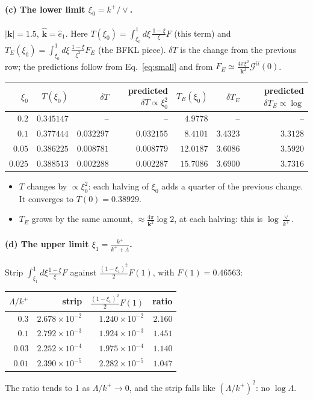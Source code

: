 \documentclass[10pt]{article}
\numberwithin{equation}{section}
\newcommand{\GG}{\mathcal G}
\begin{document}
\paragraph{(c) The lower limit $\xi_0=k^+/\vee$.} $|\mathbf k|=1.5$, $\hat{\mathbf k}=\hat e_1$. Here $T(\xi_0)=\int_{\xi_0}^1d\xi\,\frac{1-\xi}{\xi}F$ (this term) and $T_E(\xi_0)=\int_{\xi_0}^1d\xi\,\frac{1-\xi}{\xi^3}F_E$ (the BFKL piece). $\delta T$ is the change from the previous row; the predictions follow from Eq.~\eqref{eq:small} and from $F_E\simeq\frac{4\pi\xi^2}{\mathbf k^2}\GG^{ii}(0)$.
\begin{center}\small
\begin{tabular}{@{}rrrr|rrr@{}}\toprule
$\xi_0$ & $T(\xi_0)$ & $\delta T$ & predicted $\delta T\propto\xi_0^2$ & $T_E(\xi_0)$ & $\delta T_E$ & predicted $\delta T_E\propto\log$\\\midrule
$0.2$ & $0.345147$ & -- & -- & $4.9778$ & -- & --\\
$0.1$ & $0.377444$ & $0.032297$ & $0.032155$ & $8.4101$ & $3.4323$ & $3.3128$\\
$0.05$ & $0.386225$ & $0.008781$ & $0.008779$ & $12.0187$ & $3.6086$ & $3.5920$\\
$0.025$ & $0.388513$ & $0.002288$ & $0.002287$ & $15.7086$ & $3.6900$ & $3.7316$\\
\bottomrule
\end{tabular}
\end{center}
\begin{itemize}
\item $T$ changes by $\propto\xi_0^2$: each halving of $\xi_0$ adds a quarter of the previous change. It converges to $T(0)=0.38929$.
\item $T_E$ grows by the same amount, $\approx\frac{4\pi}{\mathbf k^2}\log2$, at each halving: this is $\log\frac{\vee}{k^+}$.
\end{itemize}

\paragraph{(d) The upper limit $\xi_1=\frac{k^+}{k^++\Lambda}$.} Strip $\int_{\xi_1}^1d\xi\frac{1-\xi}{\xi}F$ against $\frac{(1-\xi_1)^2}{2}F(1)$, with $F(1)=0.46563$:
\begin{center}\small
\begin{tabular}{@{}rrrr@{}}\toprule
$\Lambda/k^+$ & strip & $\frac{(1-\xi_1)^2}{2}F(1)$ & ratio\\\midrule
$0.3$ & $2.678\times10^{-2}$ & $1.240\times10^{-2}$ & $2.160$\\
$0.1$ & $2.792\times10^{-3}$ & $1.924\times10^{-3}$ & $1.451$\\
$0.03$ & $2.252\times10^{-4}$ & $1.975\times10^{-4}$ & $1.140$\\
$0.01$ & $2.390\times10^{-5}$ & $2.282\times10^{-5}$ & $1.047$\\
\bottomrule
\end{tabular}
\end{center}
The ratio tends to 1 as $\Lambda/k^+\to0$, and the strip falls like $(\Lambda/k^+)^2$: no $\log\Lambda$.
\end{document}
